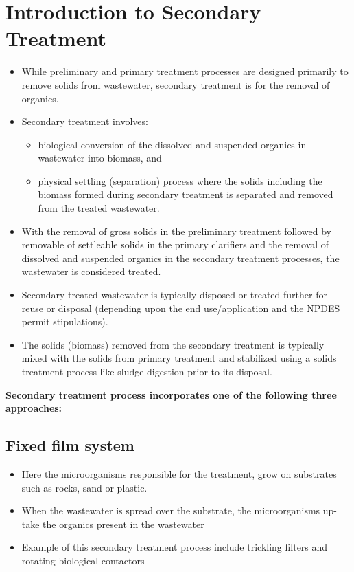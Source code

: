 
\chapter{Introduction to Secondary Treatment}
\begin{itemize}
\item While preliminary and primary treatment processes are designed primarily to remove solids from wastewater, secondary treatment is for the removal of organics.
\item Secondary treatment involves:
\begin{itemize}
\item biological conversion of the dissolved and suspended organics in wastewater into biomass, and
\item physical settling (separation) process where the solids including the biomass formed during secondary treatment is separated and removed from the treated wastewater.
\end{itemize}

\item With the removal of gross solids in the preliminary treatment followed by removable of settleable solids in the primary clarifiers and the removal of dissolved and suspended organics in the secondary treatment processes, the wastewater is considered treated.
\item Secondary treated wastewater is typically disposed or treated further for reuse or disposal (depending upon the end use/application and the NPDES permit stipulations).
\item The solids (biomass) removed from the secondary treatment is typically mixed with the solids from primary treatment and stabilized using a solids treatment process like sludge digestion prior to its disposal.
\end{itemize}
\vspace{1cm}

\textbf{Secondary treatment process incorporates one of the following three approaches:}


\section{Fixed film system}	

\begin{itemize}
\item Here the microorganisms responsible for the treatment, grow on substrates such
as rocks, sand or plastic.
\item When the wastewater is spread over the substrate, the microorganisms up-take the organics present in the wastewater
\item Example of this secondary treatment process include trickling filters and rotating biological contactors\\
\end{itemize}

